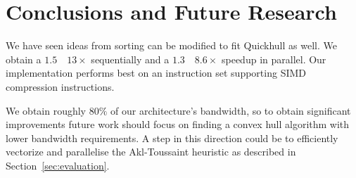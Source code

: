 \section{Conclusions and Future Research}

We have seen ideas from sorting can be modified to fit Quickhull as well.
We obtain a $1.5$~\textendash~$13\times$ sequentially and a 
$1.3$~\textendash~$8.6\times$ speedup in parallel. Our implementation performs
best on an instruction set supporting SIMD compression instructions.

We obtain roughly $80\%$ of our architecture's bandwidth, so to obtain
significant improvements future work should focus on finding a convex hull
algorithm with lower bandwidth requirements. A step in this direction could
be to efficiently vectorize and parallelise the Akl-Toussaint heuristic as
described in Section~\ref{sec:evaluation}.
